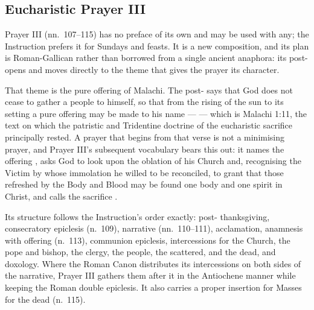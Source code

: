 \subsection{Eucharistic Prayer III}

Prayer III (nn.\ 107--115) has no preface of its own and may be used with any; the Instruction
prefers it for Sundays and feasts. It is a new composition, and its plan is Roman-Gallican
rather than borrowed from a single ancient anaphora: its post- opens  and moves directly to the
theme that gives the prayer its character.

That theme is the pure offering of Malachi. The post- says that God does not
cease to gather a people to himself, so that from the rising of the sun to its setting a pure
offering may be made to his name ---  --- which is Malachi 1:11, the text on which the patristic and
Tridentine doctrine of the eucharistic sacrifice principally rested. A prayer that begins from that verse is not a
minimising prayer, and Prayer III's subsequent vocabulary bears this out: it names the offering
, asks God to look upon the oblation of his Church and,
recognising the Victim by whose immolation he willed to be reconciled, to grant that those
refreshed by the Body and Blood may be found one body and one spirit in Christ, and calls the
sacrifice .

Its structure follows the Instruction's order exactly: post- thanksgiving,
consecratory epiclesis (n.\ 109), narrative (nn.\ 110--111), acclamation, anamnesis with
offering (n.\ 113), communion epiclesis, intercessions for the Church, the pope and bishop, the
clergy, the people, the scattered, and the dead, and doxology. Where the Roman Canon distributes
its intercessions on both sides of the narrative, Prayer III gathers them after it in the
Antiochene manner while keeping the Roman double epiclesis. It also carries a proper insertion
for Masses for the dead (n.\ 115).

